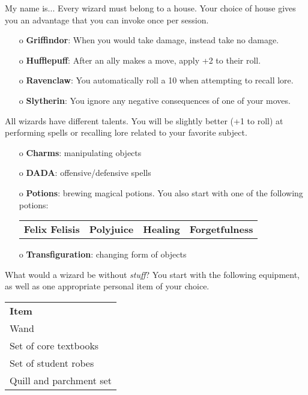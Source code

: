 \documentclass[10pt,twoside,twocolumn]{article}
\begin{document}
\begin{charactersheet}{My name is... \underline{\hspace{4cm}}}
		Every wizard must belong to a house.
		Your choice of house gives you an advantage that you can invoke once per session.
            \begin{itemize}
                \item[o] {\bf Griffindor}: When you would take damage, instead take no damage.
                \item[o] {\bf Hufflepuff}: After an ally makes a move, apply +2 to their roll.
                \item[o] {\bf Ravenclaw}: You automatically roll a 10 when attempting to recall lore.
                \item[o] {\bf Slytherin}: You ignore any negative consequences of one of your moves.
            \end{itemize}

		All wizards have different talents.
		You will be slightly better (+1 to roll) at performing spells or recalling lore related to your favorite subject.
            \begin{itemize}
                \item[o] {\bf Charms}: manipulating objects
                \item[o] {\bf DADA}: offensive/defensive spells
                \item[o] {\bf Potions}: brewing magical potions. You also start with one of the following potions: \\
                \begin{tabular}{cccc}
                    \textbf{Felix Felisis} & \textbf{Polyjuice} & \textbf{Healing} & \textbf{Forgetfulness}\\
                \end{tabular}
                \item[o] {\bf Transfiguration}: changing form of objects
            \end{itemize}

        		What would a wizard be without \emph{stuff}? 
		You start with the following equipment, as well as one appropriate personal item of your choice.

        \begin{tabular}{l}
            \textbf{Item} \\
            Wand \\
            Set of core textbooks \\
            Set of student robes \\
            Quill and parchment set \\
        \end{tabular}

    \end{charactersheet}

\end{document}
